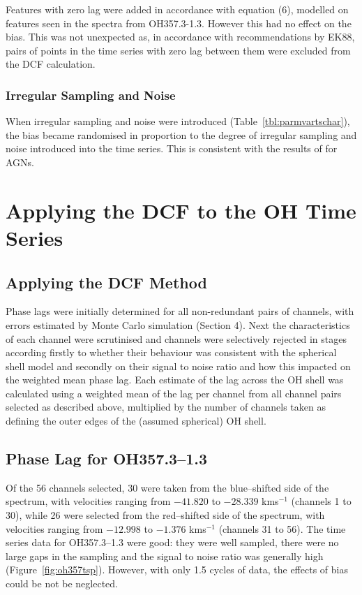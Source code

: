 \documentclass[usenatbib,usegraphicx]{mn2e}
\begin{document}
Features with zero lag were added in accordance with equation (6), modelled
on features seen in the spectra from OH357.3-1.3.  However this had no
effect on the bias.  This was not unexpected as, in accordance with
recommendations by EK88, pairs of points in the time series with zero lag
between them were excluded from the DCF calculation.

\subsubsection{Irregular Sampling and Noise}

When irregular sampling and noise were introduced
(Table~\ref{tbl:parmvartschar}), the bias became randomised in proportion to
the degree of irregular sampling and noise introduced into the time series. 
This is consistent with the results of \citet{Welsh99} for AGNs.



\section{Applying the DCF to the OH Time Series}


\subsection{Applying the DCF Method}

Phase lags were initially determined for all non-redundant pairs of
channels, with errors estimated by Monte Carlo simulation (Section 4).  Next
the characteristics of each channel were scrutinised and channels were
selectively rejected in stages according firstly to whether their behaviour
was consistent with the spherical shell model and secondly on their signal
to noise ratio and how this impacted on the weighted mean phase lag. Each
estimate of the lag across the OH shell was calculated using a weighted mean
of the lag per channel from all channel pairs selected as described above,
multiplied by the number of channels taken as defining the outer edges of
the (assumed spherical) OH shell.


\subsection{Phase Lag for OH357.3--1.3}

Of the 56 channels selected, 30 were taken from the blue--shifted side of
the spectrum, with velocities ranging from $-41.820$ to $-28.339$ kms$^{-1}$
(channels 1 to 30), while 26 were selected from the red--shifted side of the
spectrum, with velocities ranging from $-12.998$ to $-1.376$ kms$^{-1}$
(channels 31 to 56).  The time series data for OH357.3--1.3 were good: they
were well sampled, there were no large gaps in the sampling and the signal
to noise ratio was generally high (Figure~\ref{fig:oh357tsp}).  However, with 
only 1.5 cycles of data, the effects of bias could
be not be neglected. 
\end{document}
